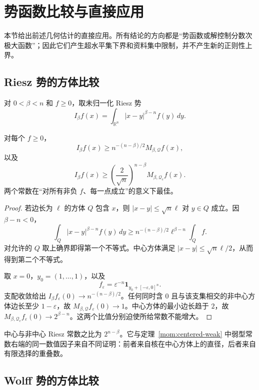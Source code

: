\section{势函数比较与直接应用}\label{app:section}

本节给出前述几何估计的直接应用。所有结论的方向都是“势函数或解控制分数次极大函数”；因此它们产生超水平集下界和资料集中限制，并不产生新的正则性上界。

\subsection{Riesz 势的方体比较}

对 $0<\beta<n$ 和 $f\ge0$，取未归一化 Riesz 势
\[
 I_\beta f(x)=\int_{\mathbb R^n}|x-y|^{\beta-n}f(y)\,dy.
\]

\begin{theorem}\label{app:riesz}
对每个 $f\ge0$，
\[
 I_\beta f(x)\ge n^{-(n-\beta)/2}M_{\beta,\mathcal Q}f(x),
\]
以及
\[
 I_\beta f(x)\ge\left(\frac{2}{\sqrt n}\right)^{n-\beta}
 M_{\beta,\mathcal Q_c}f(x).
\]
两个常数在“对所有非负 $f$、每一点成立”的意义下最佳。
\end{theorem}
\begin{proof}
若边长为 $\ell$ 的方体 $Q$ 包含 $x$，则 $|x-y|\le\sqrt n\ell$ 对 $y\in Q$ 成立。因 $\beta-n<0$，
\[
 \int_Q|x-y|^{\beta-n}f(y)\,dy
 \ge n^{-(n-\beta)/2}\ell^{\beta-n}\int_Qf.
\]
对允许的 $Q$ 取上确界即得第一个不等式。中心方体满足 $|x-y|\le\sqrt n\ell/2$，从而得到第二个不等式。

取 $x=0$，$y_0=(1,\ldots,1)$，以及
\[
 f_\varepsilon=\varepsilon^{-n}\mathbf1_{y_0+[-\varepsilon,0]^n}.
\]
支配收敛给出 $I_\beta f_\varepsilon(0)\to n^{-(n-\beta)/2}$。任何同时含 $0$ 且与该支集相交的非中心方体边长至少 $1-\varepsilon$，故 $M_{\beta,\mathcal Q}f_\varepsilon(0)\to1$。中心方体的最小边长趋于 $2$，故 $M_{\beta,\mathcal Q_c}f_\varepsilon(0)\to2^{\beta-n}$。这两个比值分别迫使所给常数不能增大。
\end{proof}

\begin{remark}\label{app:factor}
中心与非中心 Riesz 常数之比为 $2^{n-\beta}$。它与定理~\ref{mom:centered-weak} 中弱型常数右端的同一数值因子来自不同证明：前者来自核在中心方体上的直径，后者来自有限选择的重叠数。
\end{remark}

\subsection{Wolff 势的方体比较}


